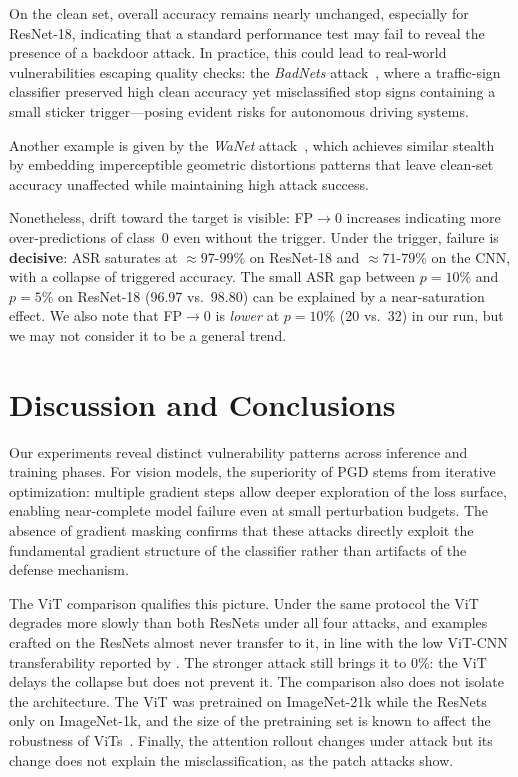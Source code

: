 \documentclass{article}
\begin{document}
On the clean set, overall accuracy remains nearly unchanged, especially for ResNet-18, indicating that a standard performance test may fail to reveal the presence of a backdoor attack. In practice, this could lead to real-world vulnerabilities escaping quality checks: the \textit{BadNets} attack~\cite{gu2019badnetsidentifyingvulnerabilitiesmachine}, where a traffic-sign classifier preserved high clean accuracy yet misclassified stop signs containing a small sticker trigger—posing evident risks for autonomous driving systems.

Another example is given by the \textit{WaNet} attack~\cite{nguyen2021wanetimperceptiblewarpingbased}, which achieves similar stealth by embedding imperceptible geometric distortions patterns that leave clean-set accuracy unaffected while maintaining high attack success.

Nonetheless, drift toward the target is visible: FP$\to$0 increases indicating more over-predictions of class~0 even without the trigger. Under the trigger, failure is \textbf{decisive}: ASR saturates at ${\approx}97$-$99\%$ on ResNet-18 and ${\approx}71$-$79\%$ on the CNN, with a collapse of triggered accuracy. The small ASR gap between $p{=}10\%$ and $p{=}5\%$ on ResNet-18 (96.97 vs.\ 98.80) can be explained by a near-saturation effect. We also note that FP$\to$0 is \emph{lower} at $p{=}10\%$ (20 vs.\ 32) in our run, but we may not consider it to be a general trend.

\section{Discussion and Conclusions}\label{sec:discussion}

Our experiments reveal distinct vulnerability patterns across inference and training phases. For vision models, the superiority of PGD stems from iterative optimization: multiple gradient steps allow deeper exploration of the loss surface, enabling near-complete model failure even at small perturbation budgets. The absence of gradient masking confirms that these attacks directly exploit the fundamental gradient structure of the classifier rather than artifacts of the defense mechanism.

The ViT comparison qualifies this picture. Under the same protocol the ViT degrades more slowly than both ResNets under all four attacks, and examples crafted on the ResNets almost never transfer to it, in line with the low ViT-CNN transferability reported by \citet{mahmood2021robustnessvisiontransformersadversarial}. The stronger attack still brings it to 0\%: the ViT delays the collapse but does not prevent it. The comparison also does not isolate the architecture. The ViT was pretrained on ImageNet-21k while the ResNets only on ImageNet-1k, and the size of the pretraining set is known to affect the robustness of ViTs~\cite{bhojanapalli2021understandingrobustnesstransformersimage}. Finally, the attention rollout changes under attack but its change does not explain the misclassification, as the patch attacks show.
\end{document}
